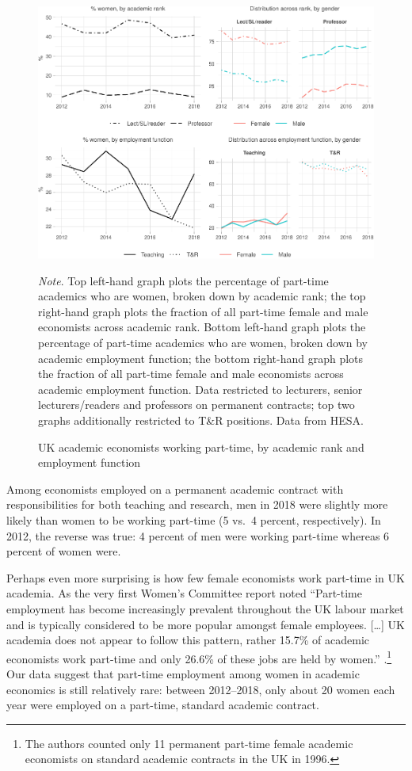 \documentclass[a4paper, 1]{article}
\begin{document}
\begin{figure}
\centering
\includegraphics[width=\linewidth]{0-images/part-time-1.pdf}

\caption{UK academic economists working part-time, by academic rank and employment function}
\label{fig:part-time}
\justify\footnotesize\textit{Note}.  Top left-hand graph plots the percentage of part-time academics who are women, broken down by academic rank; the top right-hand graph plots the fraction of all part-time female and male economists across academic rank. Bottom left-hand graph plots the percentage of part-time academics who are women, broken down by academic employment function; the bottom right-hand graph plots the fraction of all part-time female and male economists across academic employment function. Data restricted to lecturers, senior lecturers/readers and professors on permanent contracts; top two graphs additionally restricted to T\&R positions. Data from HESA.
\end{figure}



Among economists employed on a permanent academic contract with responsibilities for both teaching and research, men in 2018 were slightly more likely than women to be working part-time (5 vs.~4 percent, respectively). In 2012, the reverse was true: 4 percent of men were working part-time whereas 6 percent of women were.

Perhaps even more surprising is how few female economists work part-time in UK academia. As the very first Women's Committee report noted ``Part-time employment has become increasingly prevalent throughout the UK labour market and is typically considered to be more popular amongst female employees. {[}\ldots{]} UK academia does not appear to follow this pattern, rather 15.7\% of academic economists work part-time and only 26.6\% of these jobs are held by women.'' \citep[pp.~8--9]{Mumford1997}.\footnote{The authors counted only 11 permanent part-time female academic economists on standard academic contracts in the UK in 1996.} Our data suggest that part-time employment among women in academic economics is still relatively rare: between 2012--2018, only about 20 women each year were employed on a part-time, standard academic contract.
\end{document}
